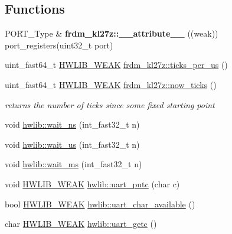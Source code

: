 \subsection*{Functions}
\begin{DoxyCompactItemize}
\item 
\mbox{\label{hwlib-frdm-kl27z_8hpp_a563eefe85dbf924f38451ca4daeb5c8e}} 
P\+O\+R\+T\+\_\+\+Type \& {\bfseries frdm\+\_\+kl27z\+::\+\_\+\+\_\+attribute\+\_\+\+\_\+} ((weak)) port\+\_\+registers(uint32\+\_\+t port)
\item 
uint\+\_\+fast64\+\_\+t \hyperlink{hwlib-defines_8hpp_a04be4340016df60d6636c1d1c6d94fc9}{H\+W\+L\+I\+B\+\_\+\+W\+E\+AK} \hyperlink{hwlib-frdm-kl27z_8hpp_a3a22a56400f28b8eb02535cb389b740a}{frdm\+\_\+kl27z\+::ticks\+\_\+per\+\_\+us} ()
\item 
uint\+\_\+fast64\+\_\+t \hyperlink{hwlib-defines_8hpp_a04be4340016df60d6636c1d1c6d94fc9}{H\+W\+L\+I\+B\+\_\+\+W\+E\+AK} \hyperlink{hwlib-frdm-kl27z_8hpp_a892420fb0c3e0a9ceaa1536d2584b196}{frdm\+\_\+kl27z\+::now\+\_\+ticks} ()
\begin{DoxyCompactList}\small\item\em returns the number of ticks since some fixed starting point \end{DoxyCompactList}\item 
void \hyperlink{namespacehwlib_a9c01a1d0319f5eadd8926e66aea19aa0}{hwlib\+::wait\+\_\+ns} (int\+\_\+fast32\+\_\+t n)
\item 
void \hyperlink{namespacehwlib_a0096b739fc566c896366ecbd3113cc1e}{hwlib\+::wait\+\_\+us} (int\+\_\+fast32\+\_\+t n)
\item 
void \hyperlink{namespacehwlib_a6119aa5d3034176aa1515ef4bb193044}{hwlib\+::wait\+\_\+ms} (int\+\_\+fast32\+\_\+t n)
\item 
void \hyperlink{hwlib-defines_8hpp_a04be4340016df60d6636c1d1c6d94fc9}{H\+W\+L\+I\+B\+\_\+\+W\+E\+AK} \hyperlink{namespacehwlib_ae568ebef4b8d8a77cecae8cea595896f}{hwlib\+::uart\+\_\+putc} (char c)
\item 
bool \hyperlink{hwlib-defines_8hpp_a04be4340016df60d6636c1d1c6d94fc9}{H\+W\+L\+I\+B\+\_\+\+W\+E\+AK} \hyperlink{namespacehwlib_aaf31868f62815d2e405ad90469ae50a5}{hwlib\+::uart\+\_\+char\+\_\+available} ()
\item 
char \hyperlink{hwlib-defines_8hpp_a04be4340016df60d6636c1d1c6d94fc9}{H\+W\+L\+I\+B\+\_\+\+W\+E\+AK} \hyperlink{namespacehwlib_aa5ee60a7ff11cc49aba41f8be7f08a67}{hwlib\+::uart\+\_\+getc} ()
\end{DoxyCompactItemize}


